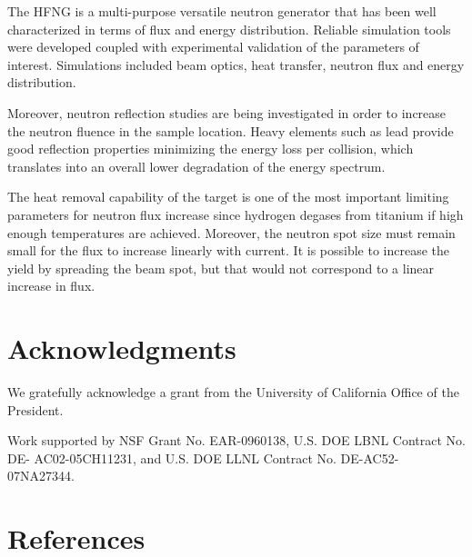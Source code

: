 \documentclass[review]{elsarticle}
\begin{document}
The HFNG is a multi-purpose versatile neutron generator that has been well characterized in terms of flux and energy distribution. Reliable simulation tools were developed coupled with experimental validation of the parameters of interest. Simulations included beam optics, heat transfer, neutron flux and energy distribution.

Moreover, neutron reflection studies are being investigated in order to increase the neutron fluence in the sample location. Heavy elements such as lead provide good reflection properties minimizing the energy loss per collision, which translates into an overall lower degradation of the energy spectrum. 

The heat removal capability of the target is one of the most important limiting parameters for neutron flux increase since hydrogen degases from titanium if high enough temperatures are achieved. Moreover, the neutron spot size must remain small for the flux to increase linearly with current. It is possible to increase the yield by spreading the beam spot, but that would not correspond to a linear increase in flux. 

\section{Acknowledgments}

We gratefully acknowledge a grant from the University of California Office of the President.
	
Work supported by NSF Grant No. EAR-0960138, U.S. DOE LBNL Contract No. DE- AC02-05CH11231, and U.S. DOE LLNL Contract No. DE-AC52-07NA27344.
	
\section*{References}
	

	
\end{document}
